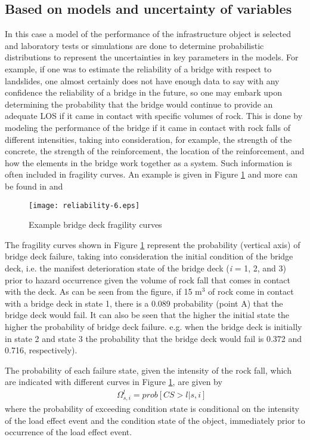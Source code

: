 \subsection{Based on models and uncertainty of variables}
%
In this case a model of the performance of the infrastructure object is selected
and laboratory tests or simulations are done to determine probabilistic
distributions to represent the uncertainties in key parameters in the models. For
example, if one was to estimate the reliability of a bridge with respect to
landslides, one almost certainly does not have enough data to say with any
confidence the reliability of a bridge in the future, so one may embark upon
determining the probability that the bridge would continue to provide an adequate
LOS if it came in contact with specific volumes of rock. This is done by modeling
the performance of the bridge if it came in contact with rock falls of different
intensities, taking into consideration, for example, the strength of the
concrete, the strength of the reinforcement, the location of the reinforcement,
and how the elements in the bridge work together as a system. Such information is
often included in fragility curves. An example is given in  Figure \ref{reliability-6} and more can be found in  \cite{Schultz2010} and \cite{Lethanh2015}
%
\begin{figure}[h]
\texttt{[image: reliability-6.eps]}
\caption{Example bridge deck fragility curves}\label{reliability-6}
\end{figure}
The fragility curves shown in  Figure \ref{reliability-6} represent the probability (vertical axis) of
bridge deck failure, taking into consideration the initial condition of the
bridge deck, i.e. the manifest deterioration state of the bridge deck (\textit{i
}= 1, 2, and 3) prior to hazard occurrence given the volume of rock fall that
comes in contact with the deck. As can be seen from the figure, if 15 m$^{3}$ of
rock come in contact with a bridge deck in state 1, there is a 0.089 probability
(point A) that the bridge deck would fail. It can also be seen that the higher
the initial state the higher the probability of bridge deck failure. e.g. when
the bridge deck is initially in state 2 and state 3 the probability that the
bridge deck would fail is 0.372 and 0.716, respectively).

The probability of each failure state, given the intensity of the rock fall,
which are indicated with different curves in Figure \ref{reliability-6}, are given by
\begin{eqnarray}
&& \Omega_{s,i}^l=prob\left[CS>l|s,i\right] \label{eqreliability:13}
\end{eqnarray}
where the probability of exceeding condition state is conditional on the intensity of the load effect event and the
condition state of the object, immediately prior to occurrence of the load effect event.

